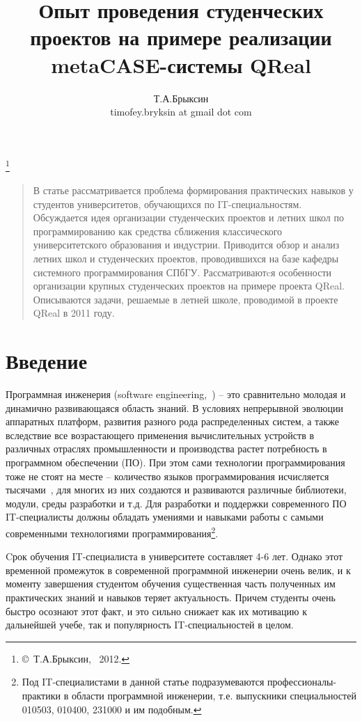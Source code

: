 \documentclass[a4paper]{article}
\title{Опыт проведения студенческих проектов на примере реализации metaCASE-системы QReal}
\author{Т.А.Брыксин \\ timofey.bryksin at gmail dot com}
\date{}
\begin{document}
\maketitle
\thispagestyle{empty}


\renewcommand{\thefootnote}{}
\footnote{\small{\copyright~Т.А.Брыксин, ~2012.}}
\renewcommand{\thefootnote}{\arabic{footnote}}
\setcounter{footnote}{0}

\begin{quote}
\small\noindent
В статье рассматривается проблема формирования практических навыков у студентов университетов, обучающихся по IT-специальностям. Обсуждается идея организации студенческих проектов и летних школ по программированию как средства сближения классического университетского образования и индустрии. Приводится обзор и анализ летних школ и студенческих проектов, проводившихся на базе кафедры системного программирования СПбГУ. Рассматриваютcя особенности организации крупных студенческих проектов на примере проекта QReal. Описываются задачи, решаемые в летней школе, проводимой в проекте QReal в 2011 году. 
\end{quote}


\section*{Введение} 
Программная инженерия (software engineering,~\cite{terekhov1, swebok}) -- это сравнительно молодая и динамично развивающаяся область знаний. В условиях непрерывной эволюции аппаратных платформ, развития разного рода распределенных систем, а также вследствие все возрастающего применения вычислительных устройств в различных отраслях промышленности и производства растет потребность в программном обеспечении (ПО).  При этом сами технологии программирования тоже не стоят на месте -- количество языков программирования исчисляется тысячами~\cite{langList}, для многих из них создаются и развиваются различные библиотеки, модули, среды разработки и т.д. Для разработки и поддержки современного ПО IT-специалисты должны обладать умениями и навыками работы с самыми современными технологиями программирования\footnote{Под IT-специалистами в данной статье подразумеваются профессионалы-практики в области программной инженерии, т.е. выпускники специальностей 010503, 010400, 231000 и им подобным.}. 
 
Cрок обучения IT-специалиста в университете составляет 4-6 лет. Однако этот временной промежуток  в современной программной инженерии очень велик, и к моменту завершения студентом обучения существенная часть полученных им практических знаний и навыков теряет актуальность. Причем студенты очень быстро осознают этот факт, и это сильно снижает как их мотивацию к дальнейшей учебе, так и популярность IT-специальностей в целом. 
\end{document}
